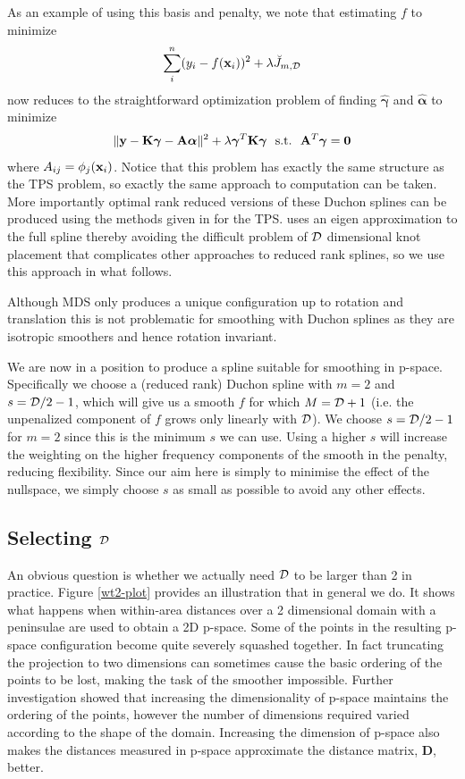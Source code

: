 \documentclass[smallextended]{svjour3}       %
\newcommand{\ts}{^T}
\begin{document}
As an example of using this basis and penalty, we note that estimating $f$ to minimize
$$
\sum_i^n (y_i - f({\bf x}_i))^2 + \lambda \breve{J}_{m,{\cal D}}
$$
now reduces to the straightforward optimization problem of finding $\hat {\bm \gamma} $ and $\hat {\bm \alpha}$ to minimize
$$
\|{\bf y} - {\bf K } {\bm \gamma} - {\bf A}{\bm \alpha}  \|^2 + \lambda {\bm \gamma}\ts {\bf K} {\bm \gamma} ~~\text{s.t.}~~{\bf A}\ts {\bm \gamma} = {\bf 0}
$$
where $A_{ij} = \phi_j({\bf x}_i)$. Notice that this problem has exactly the same structure as the TPS problem, so exactly the same approach to computation can be taken. More importantly optimal rank reduced versions of these Duchon splines can be produced using the methods given in \cite{Wood:2003tc} for the TPS. \cite{Wood:2003tc} uses an eigen approximation to the full spline thereby avoiding the difficult problem of $\cal D$ dimensional knot placement that complicates other approaches to reduced rank splines, so we use this approach in what follows.

Although MDS only produces a unique configuration up to rotation and translation this is not problematic for smoothing with Duchon splines as they are isotropic smoothers and hence rotation invariant.

We are now in a position to produce a spline suitable for smoothing in p-space. Specifically we choose a (reduced rank) Duchon spline with $m=2$ and $s = {\cal D}/2 - 1$, which will give us a smooth $f$ for which $M={\cal D}+1$ (i.e. the unpenalized component of $f$ grows only linearly with $\cal D$). We choose $s = {\cal D}/2 - 1$ for $m=2$ since this is the minimum $s$ we can use. Using a higher $s$ will increase the weighting on the higher frequency components of the smooth in the penalty, reducing flexibility. Since our aim here is simply to minimise the effect of the nullspace, we simply choose $s$ as small as possible to avoid any other effects.

\subsection{Selecting $\cal D$}
\label{s:mdsdimselect}

An obvious question is whether we actually need $\cal D$ to be larger than 2 in practice. Figure \ref{wt2-plot} provides an illustration that in general we do. It shows what happens when within-area distances over a 2 dimensional domain with a peninsulae are used to obtain a 2D p-space. Some of the points in the resulting p-space configuration become quite severely squashed together. In fact truncating the projection to two dimensions can sometimes cause the basic ordering of the points to be lost, making the task of the smoother impossible. Further investigation showed that increasing the dimensionality of p-space maintains the ordering of the points, however the number of dimensions required varied according to the shape of the domain. Increasing the dimension of p-space also makes the distances measured in p-space approximate the distance matrix, $\mathbf{D}$, better.
\end{document}
